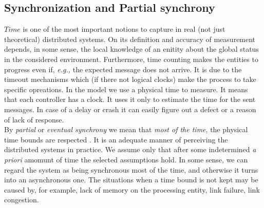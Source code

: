 \documentclass{article}
\theoremstyle{remark}
\begin{document}
\subsection{Synchronization and Partial synchrony}
$Time$ is one of the most important notions to capture in real (not just theoretical) distributed systems. On its definition and accuracy of measurement depends, in some sense, the local knowledge of an enitity about the global status in the considered environment. Furthermore, time counting makes the entities to progress even if, \emph{e.g., }the expected message does not arrive. It is due to the timeout mechanisms which (if there not logical clocks) make the process to take specific opreations.
In the model we use a physical time to measure. It means that each controller has a clock. It uses it only to estimate the time for the sent messages. In case of a delay or crash it can easily figure out a defect or a reason of lack of response.\\
By \emph{partial} or \emph{eventual synchrony} we mean that \emph{most of the time}, the physical time bounds are respected \cite{Guerraoui:2010:IRD:1951643}. It is an adequate manner of perceiving the distributed systems in practice. We assume only that after some indetermined \emph{a priori} amomunt of time the selected assumptions hold. In some sense, we can regard the system as being synchronous most of the time, and otherwise it turns into an  asynchronous one.
The situations when a time bound is not kept may be caused by, for example, lack of memory on the processing entity, link failure, link congestion.
\end{document}
